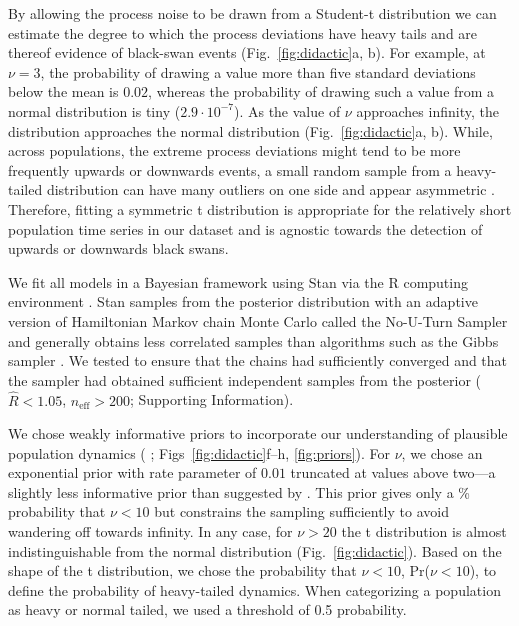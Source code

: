 By allowing the process noise to be drawn from a Student-t distribution we can
estimate the degree to which the process deviations have heavy tails and are
thereof evidence of black-swan events (Fig.~\ref{fig:didactic}a, b). For
example, at $\nu = 3$, the probability of drawing a value more than five
standard deviations below the mean is $0.02$, whereas the probability of
drawing such a value from a normal distribution is tiny ($2.9\cdot10^{-7}$).
As the value of $\nu$ approaches infinity, the distribution approaches the
normal distribution (Fig.~\ref{fig:didactic}a, b). While, across populations,
the extreme process deviations might tend to be more frequently upwards or
downwards events, a small random sample from a heavy-tailed distribution can
have many outliers on one side and appear asymmetric \citep{gelman2013a}.
Therefore, fitting a symmetric t distribution is appropriate for the
relatively short population time series in our dataset and is agnostic towards
the detection of upwards or downwards black swans.

We fit all models in a Bayesian framework using Stan \citep{stan-manual2014}
via the R computing environment \citep{r2014}. Stan samples from the posterior
distribution with an adaptive version of Hamiltonian Markov chain Monte Carlo
called the No-U-Turn Sampler and generally obtains less correlated samples
than algorithms such as the Gibbs sampler \citep{hoffman2014}. We tested to
ensure that the chains had sufficiently converged and that the sampler had
obtained sufficient independent samples from the posterior ($\widehat{R} <
1.05$, $n_\mathrm{eff} > 200$; Supporting Information).

We chose weakly informative priors to incorporate our understanding of
plausible population dynamics (\citeauthor{gelman2014} \citeyear{gelman2014};
Figs~\ref{fig:didactic}f--h, \ref{fig:priors}). For $\nu$, we chose an
exponential prior with rate parameter of $0.01$ truncated at values above
two---a slightly less informative prior than suggested by
\citet{fernandez1998}. This prior gives only a \basePriorProbHeavy \%
probability that $\nu < 10$ but constrains the sampling sufficiently to avoid
wandering off towards infinity. In any case, for $\nu > 20$ the t distribution
is almost indistinguishable from the normal distribution
(Fig.~\ref{fig:didactic}). Based on the shape of the t distribution, we chose
the probability that $\nu < 10$, Pr($\nu < 10$), to define the probability of
heavy-tailed dynamics. When categorizing a population as heavy or normal tailed,
we used a threshold of 0.5 probability.


